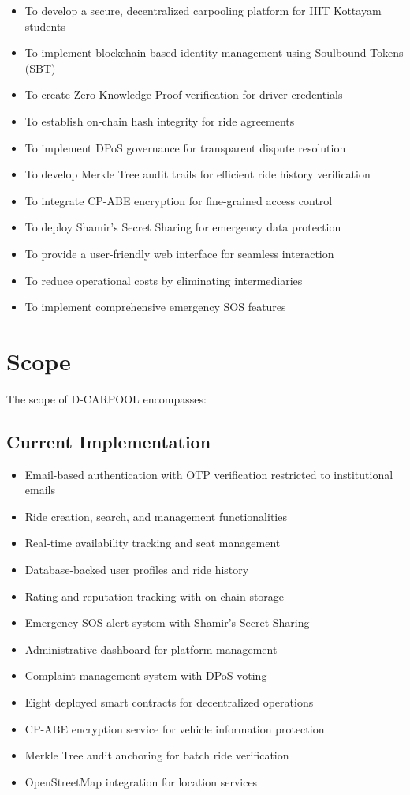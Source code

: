 \begin{itemize}
    \item To develop a secure, decentralized carpooling platform for IIIT Kottayam students
    \item To implement blockchain-based identity management using Soulbound Tokens (SBT)
    \item To create Zero-Knowledge Proof verification for driver credentials
    \item To establish on-chain hash integrity for ride agreements
    \item To implement DPoS governance for transparent dispute resolution
    \item To develop Merkle Tree audit trails for efficient ride history verification
    \item To integrate CP-ABE encryption for fine-grained access control
    \item To deploy Shamir's Secret Sharing for emergency data protection
    \item To provide a user-friendly web interface for seamless interaction
    \item To reduce operational costs by eliminating intermediaries
    \item To implement comprehensive emergency SOS features
\end{itemize}

\section{Scope}

The scope of D-CARPOOL encompasses:

\subsection{Current Implementation}

\begin{itemize}
    \item Email-based authentication with OTP verification restricted to institutional emails
    \item Ride creation, search, and management functionalities
    \item Real-time availability tracking and seat management
    \item Database-backed user profiles and ride history
    \item Rating and reputation tracking with on-chain storage
    \item Emergency SOS alert system with Shamir's Secret Sharing
    \item Administrative dashboard for platform management
    \item Complaint management system with DPoS voting
    \item Eight deployed smart contracts for decentralized operations
    \item CP-ABE encryption service for vehicle information protection
    \item Merkle Tree audit anchoring for batch ride verification
    \item OpenStreetMap integration for location services
\end{itemize}

